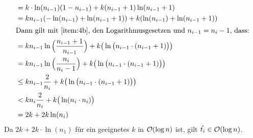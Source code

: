 \documentclass{scrartcl} %
\begin{document}
\begin{aufgabe}
\begin{enumerate}[label=(\alph*)]
\begin{align*}
            &= k \cdot \ln (n_{i-1}) (1 - n_{i-1}) + k(n_{i-1}+1)\ln(n_{i-1}+1)\\
            &= kn_{i-1} (-\ln(n_{i-1}) + \ln(n_{i-1}+1)) + k (\ln (n_{i-1}) + \ln(n_{i-1}+1))\\
            \intertext{Dann gilt mit \ref{item:4b}, den Logarithmusgesetzen und $n_{i-1}=n_i -1$, dass:}
            &= kn_{i-1} \ln\Big(\frac{n_{i-1}+1}{n_{i-1}}\Big) + k \big(\ln \big(n_{i-1} \cdot (n_{i-1}+1)\big)\big)\\
            &= kn_{i-1} \ln\Big(\frac{n_i}{n_i -1}\Big) + k \big(\ln \big(n_{i-1} \cdot (n_{i-1}+1)\big)\big)\\
            &\leq kn_{i-1} \frac{2}{n_i} + k \big(\ln \big(n_{i-1} \cdot (n_{i-1}+1)\big)\big)\\
            &< kn_{i} \frac{2}{n_i} + k \big(\ln (n_i \cdot n_i)\big)\\
            &= 2k + 2k \ln (n_i)\\
            \end{align*}
            Da $2k + 2k \cdot \ln(n_1)$ für ein geeignetes $k$ in $\operatorname{\mathcal{O}}(\log n)$ ist, gilt $\hat{t_i} \in \operatorname{\mathcal{O}}(\log n)$.

\end{enumerate}
\end{aufgabe}
\end{document}
